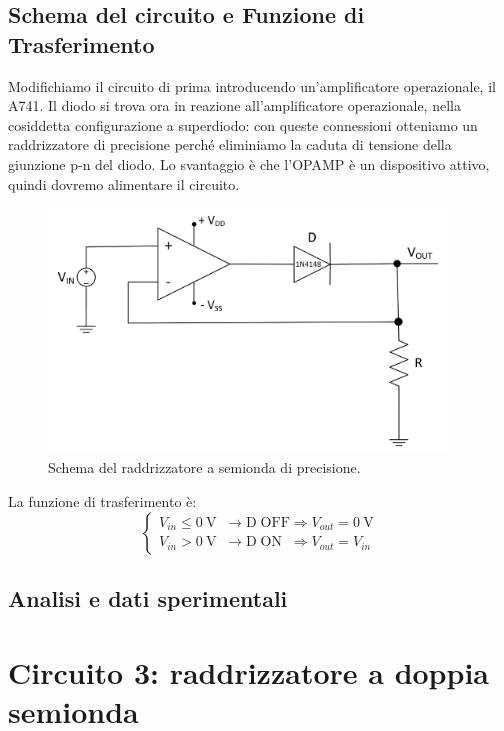 \documentclass{report}
\begin{document}
\subsection{Schema del circuito e Funzione di Trasferimento}
Modifichiamo il circuito di prima introducendo un'amplificatore operazionale, il \textmu A741. Il diodo si trova ora in reazione all'amplificatore operazionale, nella cosiddetta configurazione a superdiodo: con queste connessioni otteniamo un raddrizzatore di precisione perché eliminiamo la caduta di tensione della giunzione p-n del diodo. Lo svantaggio è che l'OPAMP è un dispositivo attivo, quindi dovremo alimentare il circuito.\par
\begin{figure}[h]
	\centering
	\includegraphics[height=6.5cm]{immagini/schema2}
	\caption{Schema del raddrizzatore a semionda di precisione.}
	\label{figura:schema2}
\end{figure}
\noindent La funzione di trasferimento è:
\begin{equation}
   \begin{cases}
   V_{in}\le \SI{0}{\volt}\;\;\rightarrow \mathrm{D\;OFF} \Rightarrow V_{out} =\SI{0}{\volt}\\
   V_{in}> \SI{0}{\volt}\;\;\rightarrow \mathrm{D\;ON}\;\; \Rightarrow V_{out} = V_{in}
   \end{cases}
\end{equation}
\subsection{Analisi e dati sperimentali}

\newpage
\section{Circuito 3: raddrizzatore a doppia semionda}
\end{document}
